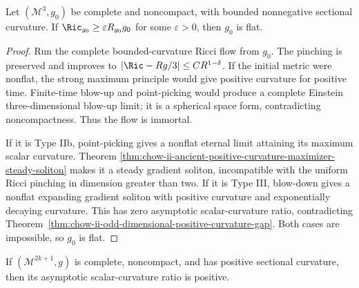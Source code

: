 \begin{theorem}
\label{thm:chow-ii-pinched-noncompact-three-manifold-flat}
Let \((\mathcal M^3,g_0)\) be complete and noncompact, with bounded
nonnegative sectional curvature.  If
\(\Ric_{g_0}\ge\varepsilon R_{g_0}g_0\) for some \(\varepsilon>0\), then
\(g_0\) is flat.
\end{theorem}
\begin{proof}
\sketch Run the complete bounded-curvature Ricci flow from \(g_0\).  The pinching is
preserved and improves to
\(|\Ric-Rg/3|\le CR^{1-\delta}\).  If the initial metric were nonflat, the
strong maximum principle would give positive curvature for positive time.
Finite-time blow-up and point-picking would produce a complete Einstein
three-dimensional blow-up limit; it is a spherical space form, contradicting
noncompactness.  Thus the flow is immortal.

If it is Type IIb, point-picking gives a nonflat eternal limit attaining its
maximum scalar curvature.  Theorem
\ref{thm:chow-ii-ancient-positive-curvature-maximizer-steady-soliton} makes it
a steady gradient soliton, incompatible with the uniform Ricci pinching in
dimension greater than two.  If it is Type III, blow-down gives a nonflat
expanding gradient soliton with positive curvature and exponentially decaying
curvature.  This has zero asymptotic scalar-curvature ratio, contradicting
Theorem~\ref{thm:chow-ii-odd-dimensional-positive-curvature-gap}.  Both cases
are impossible, so \(g_0\) is flat.
\end{proof}

\begin{theorem}
\label{thm:chow-ii-odd-dimensional-positive-curvature-gap}
If \((\mathcal M^{2k+1},g)\) is complete, noncompact, and has positive
sectional curvature, then its asymptotic scalar-curvature ratio is positive.
\end{theorem}

